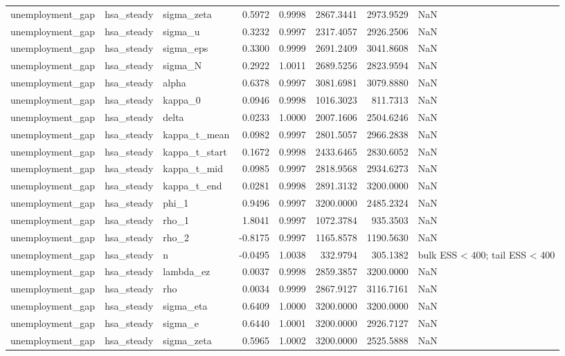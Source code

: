 \begin{tabular}{lllrrrrl}
unemployment\_gap & hsa\_steady & sigma\_zeta & 0.5972 & 0.9998 & 2867.3441 & 2973.9529 & NaN \\
unemployment\_gap & hsa\_steady & sigma\_u & 0.3232 & 0.9997 & 2317.4057 & 2926.2506 & NaN \\
unemployment\_gap & hsa\_steady & sigma\_eps & 0.3300 & 0.9999 & 2691.2409 & 3041.8608 & NaN \\
unemployment\_gap & hsa\_steady & sigma\_N & 0.2922 & 1.0011 & 2689.5256 & 2823.9594 & NaN \\
unemployment\_gap & hsa\_steady & alpha & 0.6378 & 0.9997 & 3081.6981 & 3079.8880 & NaN \\
unemployment\_gap & hsa\_steady & kappa\_0 & 0.0946 & 0.9998 & 1016.3023 & 811.7313 & NaN \\
unemployment\_gap & hsa\_steady & delta & 0.0233 & 1.0000 & 2007.1606 & 2504.6246 & NaN \\
unemployment\_gap & hsa\_steady & kappa\_t\_mean & 0.0982 & 0.9997 & 2801.5057 & 2966.2838 & NaN \\
unemployment\_gap & hsa\_steady & kappa\_t\_start & 0.1672 & 0.9998 & 2433.6465 & 2830.6052 & NaN \\
unemployment\_gap & hsa\_steady & kappa\_t\_mid & 0.0985 & 0.9997 & 2818.9568 & 2934.6273 & NaN \\
unemployment\_gap & hsa\_steady & kappa\_t\_end & 0.0281 & 0.9998 & 2891.3132 & 3200.0000 & NaN \\
unemployment\_gap & hsa\_steady & phi\_1 & 0.9496 & 0.9997 & 3200.0000 & 2485.2324 & NaN \\
unemployment\_gap & hsa\_steady & rho\_1 & 1.8041 & 0.9997 & 1072.3784 & 935.3503 & NaN \\
unemployment\_gap & hsa\_steady & rho\_2 & -0.8175 & 0.9997 & 1165.8578 & 1190.5630 & NaN \\
unemployment\_gap & hsa\_steady & n & -0.0495 & 1.0038 & 332.9794 & 305.1382 & bulk ESS < 400; tail ESS < 400 \\
unemployment\_gap & hsa\_steady & lambda\_ez & 0.0037 & 0.9998 & 2859.3857 & 3200.0000 & NaN \\
unemployment\_gap & hsa\_steady & rho & 0.0034 & 0.9999 & 2867.9127 & 3116.7161 & NaN \\
unemployment\_gap & hsa\_steady & sigma\_eta & 0.6409 & 1.0000 & 3200.0000 & 3200.0000 & NaN \\
unemployment\_gap & hsa\_steady & sigma\_e & 0.6440 & 1.0001 & 3200.0000 & 2926.7127 & NaN \\
unemployment\_gap & hsa\_steady & sigma\_zeta & 0.5965 & 1.0002 & 3200.0000 & 2525.5888 & NaN \\

\end{tabular}
